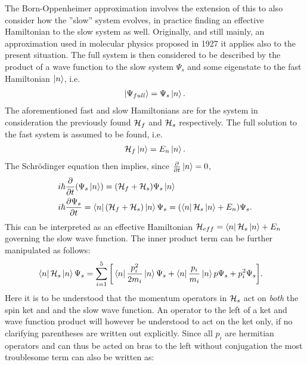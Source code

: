 \documentclass[a4paper]{article}
\begin{document}
The Born-Oppenheimer approximation involves the extension of this to also consider how the
''slow'' system evolves, in practice finding an effective Hamiltonian to the slow system as
well. Originally, and still mainly, an approximation used in molecular physics proposed in
1927 \cite{bo} it applies also to the present situation. The full system is then considered to be described by the product of a wave function to the slow
system \(\Psi_s\) and  some eigenstate to the fast Hamiltonian \(\ket{n}\), i.e.
\begin{align*}
        \ket{\Psi_{full}} = \Psi_s\ket{n}
.\end{align*}
The aforementioned fast and slow Hamiltonians are for the system in consideration the
previously found \(\mathbb{\cal H}_f\) and \(\mathbb{\cal H}_s\) respectively. The full
solution to the fast system is assumed to be found, i.e.
\begin{align*}
        \mathbb{\cal H}_f \ket{n} = E_n\ket{n}
.\end{align*}
The Schrödinger equation then implies, since \(\frac{\partial }{\partial t} \ket{n} = 0\),
\begin{align*}
        &i\hbar{}\frac{\partial }{\partial t} (\Psi_s\ket{n}) = (\mathbb{\cal H}_f +
        \mathbb{\cal H}_s) \Psi_s\ket{n}\\
        &i\hbar{}\frac{\partial \Psi_s}{\partial t} = \bra{n}(\mathbb{\cal H}_f +
        \mathbb{\cal H}_s)\ket{n}\Psi_s = (\bra{n}\mathbb{\cal H}_s\ket{n} +
        E_n)\Psi_s
.\end{align*}
This can be interpreted as an effective Hamiltonian \(\mathbb{\cal H}_{eff} =
\bra{n}\mathbb{\cal H}_s\ket{n} + E_n\) governing the slow wave function.
The inner product term can be further manipulated as follows:
\begin{align*}
        \bra{n} \mathbb{\cal H}_s \ket{n} \Psi_s &= \sum_{i=1}^{5} \bigg[\bra{n}
        \frac{p_i^2}{2m_i}\ket{n} \Psi_s + \bra{n} \frac{p_i}{m_i} \ket{n}
        p\Psi_s + p_i^2\Psi_s\bigg]
.\end{align*}
Here it is to be understood that the momentum operators in \(\mathbb{\cal H}_s\) act on
\textit{both} the spin ket and
and the slow wave function. An operator to the left of a ket and wave function product will
however be understood to act on the ket only, if no clarifying parentheses are written out
explicitly.
Since all \(p_i\) are hermitian operators and can thus be acted on bras to the left
without conjugation the most troublesome term can also be
written as: %
\end{document}
